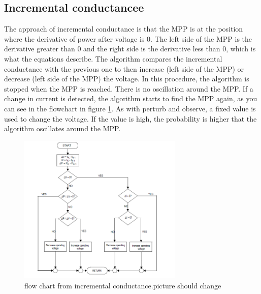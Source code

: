 \subsection{Incremental conductancee}
The approach of incremental conductance is that the MPP is at the position where the derivative of power after voltage is 0. The left side of the MPP is the derivative greater than 0 and the right side is the derivative less than 0, which is what the equations describe. The algorithm compares the incremental conductance with the previous one to then increase (left side of the MPP) or decrease (left side of the MPP) the voltage.  In this procedure, the algorithm is stopped when the MPP is reached. There is no oscillation around the MPP. If a change in current is detected, the algorithm starts to find the MPP again, as you can see in the flowchart in figure \ref{fcincrementalc}. As with perturb and observe, a fixed value is used to change the voltage. If the value is high, the probability is higher that the algorithm oscillates around the MPP. 

\begin{figure}[htbp]
	\begin{center}
		\includegraphics[width=0.7\textwidth]{../Pictures/flow_chart_incremental_conductance}
		\caption{flow chart from incremental conductance.picture should change }
		\label{fcincrementalc}
	\end{center}	
\end{figure}


